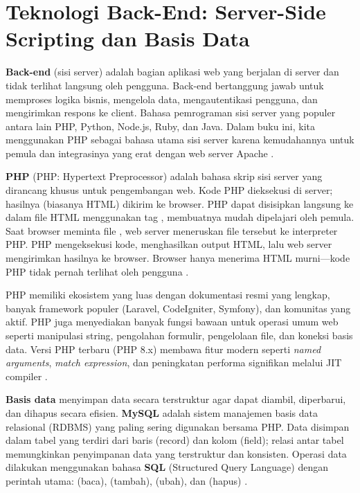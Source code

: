 \section{Teknologi Back-End: Server-Side Scripting dan Basis Data}
\textbf{Back-end} (sisi server) adalah bagian aplikasi web yang berjalan di server dan tidak terlihat langsung oleh pengguna. Back-end bertanggung jawab untuk memproses logika bisnis, mengelola data, mengautentikasi pengguna, dan mengirimkan respons ke client. Bahasa pemrograman sisi server yang populer antara lain PHP, Python, Node.js, Ruby, dan Java. Dalam buku ini, kita menggunakan PHP sebagai bahasa utama sisi server karena kemudahannya untuk pemula dan integrasinya yang erat dengan web server Apache \cite{phpManual}.

\textbf{PHP} (PHP: Hypertext Preprocessor) adalah bahasa skrip sisi server yang dirancang khusus untuk pengembangan web. Kode PHP dieksekusi di server; hasilnya (biasanya HTML) dikirim ke browser. PHP dapat disisipkan langsung ke dalam file HTML menggunakan tag , membuatnya mudah dipelajari oleh pemula. Saat browser meminta file , web server meneruskan file tersebut ke interpreter PHP. PHP mengeksekusi kode, menghasilkan output HTML, lalu web server mengirimkan hasilnya ke browser. Browser hanya menerima HTML murni---kode PHP tidak pernah terlihat oleh pengguna \cite{phpRightWay}.

PHP memiliki ekosistem yang luas dengan dokumentasi resmi yang lengkap, banyak framework populer (Laravel, CodeIgniter, Symfony), dan komunitas yang aktif. PHP juga menyediakan banyak fungsi bawaan untuk operasi umum web seperti manipulasi string, pengolahan formulir, pengelolaan file, dan koneksi basis data. Versi PHP terbaru (PHP 8.x) membawa fitur modern seperti \textit{named arguments}, \textit{match expression}, dan peningkatan performa signifikan melalui JIT compiler \cite{phpManual}.

\textbf{Basis data} menyimpan data secara terstruktur agar dapat diambil, diperbarui, dan dihapus secara efisien. \textbf{MySQL} adalah sistem manajemen basis data relasional (RDBMS) yang paling sering digunakan bersama PHP. Data disimpan dalam tabel yang terdiri dari baris (record) dan kolom (field); relasi antar tabel memungkinkan penyimpanan data yang terstruktur dan konsisten. Operasi data dilakukan menggunakan bahasa \textbf{SQL} (Structured Query Language) dengan perintah utama:  (baca),  (tambah),  (ubah), dan  (hapus) \cite{mysqlDocs}.

